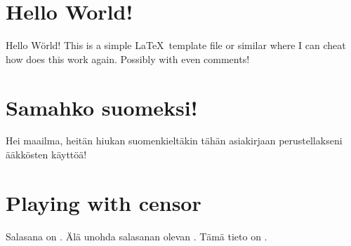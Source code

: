 \documentclass[a4paper,12pt]{artikel1}
\begin{document}
\section*{Hello World!}

Hello Wörld! This is a simple \LaTeX\ template file or similar where I can
cheat how does this work again. Possibly with even comments!

\section*{Samahko suomeksi!}

Hei maailma, heitän hiukan suomenkieltäkin tähän asiakirjaan perustellakseni
ääkkösten käyttöä!

\section*{Playing with censor}


\def \Password{}
\def \Huippusalainen{\censor*{14}}

Salasana on \Password. Älä unohda salasanan olevan \Password. Tämä tieto on \Huippusalainen.

\end{document}
